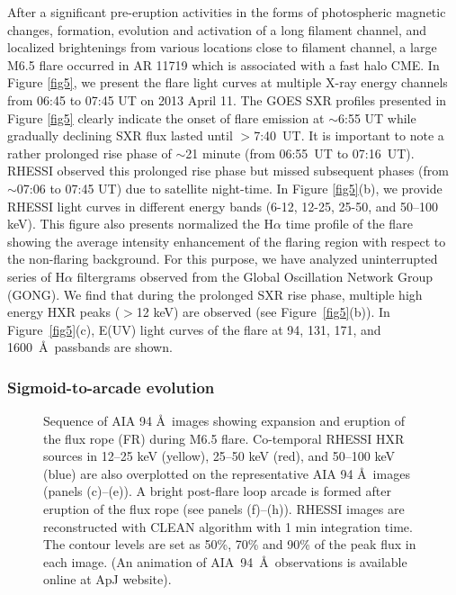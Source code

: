 \documentclass[twocolumn]{aastex6}
\begin{document}
After a significant pre-eruption activities in the forms of photospheric 	magnetic changes, formation, evolution and activation of a long filament channel, and localized brightenings from various locations close to filament channel, a large M6.5 flare occurred in AR 11719 which is associated with a fast halo CME. In Figure \ref{fig5}, we present the flare light curves at multiple X-ray energy channels from 06:45 to 07:45 UT on 2013 April 11. The GOES SXR profiles presented in Figure \ref{fig5} clearly indicate the onset of flare emission at $\sim $6:55 UT while gradually declining SXR flux lasted until $>$7:40~UT. It is important to note a rather prolonged rise phase of $ \sim $21 minute (from 06:55~UT to 07:16~UT). RHESSI observed this prolonged rise phase but missed subsequent phases (from $ \sim $07:06 to 07:45 UT) due to satellite night-time. In Figure \ref{fig5}(b), we provide RHESSI light curves in different energy bands (6-12, 12-25, 25-50, and 50--100 keV). This figure also presents normalized the H$\alpha$ time profile of the flare showing the average intensity enhancement of the flaring region with respect to the non-flaring background. For this purpose, we have analyzed uninterrupted series of H$\alpha$ filtergrams observed from the Global Oscillation Network Group (GONG). We find that during the prolonged SXR rise phase, multiple high energy HXR peaks ($>$12 keV) are observed (see Figure~\ref{fig5}(b)). In Figure~\ref{fig5}(c), E(UV) light curves of the flare at 94, 131, 171, and 1600~\AA~passbands are shown. 
 
\subsubsection{Sigmoid-to-arcade evolution}

\begin{figure*}
\vspace{-1.0cm}
\caption{Sequence of AIA 94 \AA~images showing expansion and eruption of the flux rope (FR) during M6.5 flare. Co-temporal RHESSI HXR sources in 12--25 keV (yellow), 25--50 keV (red), and 50--100 keV (blue) are also overplotted on the representative AIA 94 \AA~images (panels (c)--(e)). A bright post-flare loop arcade is formed after eruption of the flux rope (see panels (f)--(h)). RHESSI images are reconstructed with CLEAN algorithm with 1 min integration time. The contour levels are set as 50\%, 70\% and 90\% of the peak flux in each image. (An animation of AIA~94~\AA~observations is available online at ApJ website).}
\label{fig6}
\end{figure*}
\end{document}
